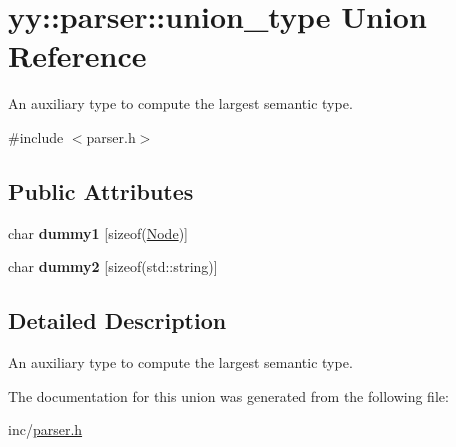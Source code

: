 \hypertarget{unionyy_1_1parser_1_1union__type}{}\section{yy\+:\+:parser\+:\+:union\+\_\+type Union Reference}
\label{unionyy_1_1parser_1_1union__type}


An auxiliary type to compute the largest semantic type.  




{\ttfamily \#include $<$parser.\+h$>$}

\subsection*{Public Attributes}
\begin{DoxyCompactItemize}
\item 
\hypertarget{unionyy_1_1parser_1_1union__type_a5baa255fe5e0b7489d5324a752f6102e}{}char {\bfseries dummy1} \mbox{[}sizeof(\hyperlink{classNode}{Node})\mbox{]}\label{unionyy_1_1parser_1_1union__type_a5baa255fe5e0b7489d5324a752f6102e}

\item 
\hypertarget{unionyy_1_1parser_1_1union__type_aa4a36df87157eb8fcd0ec84db00ded50}{}char {\bfseries dummy2} \mbox{[}sizeof(std\+::string)\mbox{]}\label{unionyy_1_1parser_1_1union__type_aa4a36df87157eb8fcd0ec84db00ded50}

\end{DoxyCompactItemize}


\subsection{Detailed Description}
An auxiliary type to compute the largest semantic type. 

The documentation for this union was generated from the following file\+:\begin{DoxyCompactItemize}
\item 
inc/\hyperlink{parser_8h}{parser.\+h}\end{DoxyCompactItemize}
